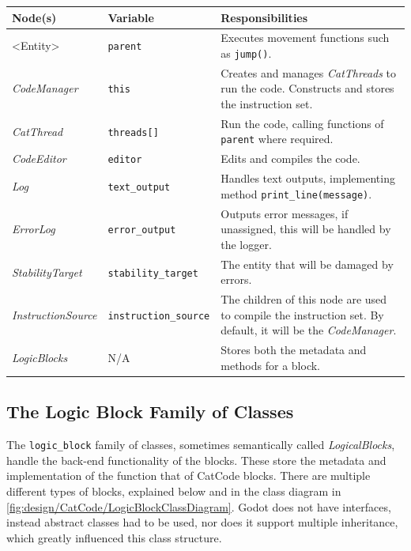 \begin{fullwidthtable}[]
    \centering
    \small{
    \begin{tabular}{llp{10cm}}\toprule
        Node(s)	& Variable & Responsibilities \\\midrule
        <Entity> & \texttt{parent} & Executes movement functions such as \texttt{jump()}. \\
        \textit{CodeManager} & \texttt{this} & Creates and manages \textit{CatThreads} to run the code. Constructs and stores the instruction set. \\
        \textit{CatThread} & \texttt{threads[]} & Run the code, calling functions of \texttt{parent} where required. \\
        \textit{CodeEditor} & \texttt{editor} & Edits and compiles the code. \\
        \textit{Log} & \texttt{text\_output} & Handles text outputs, implementing method \texttt{print\_line(message)}. \\
        \textit{ErrorLog} & \texttt{error\_output} & Outputs error messages, if unassigned, this will be handled by the logger. \\
        \textit{StabilityTarget} & \texttt{stability\_target} & The entity that will be damaged by errors. \\
        \textit{InstructionSource} & \texttt{instruction\_source} & The children of this node are used to compile the instruction set. By default, it will be the \textit{CodeManager}. \\
        \textit{LogicBlocks} & N/A & Stores both the metadata and methods for a block. \\ \bottomrule
    \end{tabular}
    }
    \caption{CatCode components and their responsibilities}
    \label{tab:design/CatCode/ComponentResponsibilities}
\end{fullwidthtable}

\subsection{The Logic Block Family of Classes}

The \texttt{logic\_block} family of classes, sometimes semantically called \textit{LogicalBlocks}, handle the back-end functionality of the blocks. These store the metadata and implementation of the function that of CatCode blocks. There are multiple different types of blocks, explained below and in the class diagram in \autoref{fig:design/CatCode/LogicBlockClassDiagram}. Godot does not have interfaces, instead abstract classes had to be used, nor does it support multiple inheritance, which greatly influenced this class structure.

